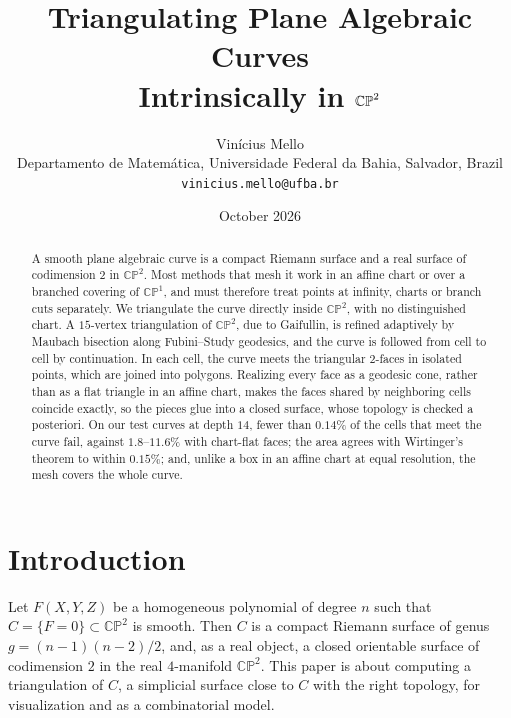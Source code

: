 \documentclass[11pt]{article}
\title{\bf Triangulating Plane Algebraic Curves\\ Intrinsically in $\CP^2$}
\author{Vin\'icius Mello\\[2pt]
{\small Departamento de Matem\'atica, Universidade Federal da Bahia, Salvador, Brazil}\\
{\small\texttt{vinicius.mello@ufba.br}}}
\date{October 2026}
\theoremstyle{plain}
\theoremstyle{definition}
\theoremstyle{remark}
\newcommand{\CP}{\mathbb{CP}}
\begin{document}
\maketitle

\begin{abstract}
A smooth plane algebraic curve is a compact Riemann surface and a real
surface of codimension $2$ in $\CP^2$. Most methods that mesh it work in
an affine chart or over a branched covering of $\CP^1$, and must
therefore treat points at infinity, charts or branch cuts separately. We
triangulate the curve directly inside $\CP^2$, with no distinguished
chart. A $15$-vertex triangulation of $\CP^2$, due to Gaifullin, is
refined adaptively by Maubach bisection along Fubini--Study geodesics,
and the curve is followed from cell to cell by continuation. In each
cell, the curve meets the triangular $2$-faces in isolated points, which
are joined into polygons. Realizing every face as a geodesic cone,
rather than as a flat triangle in an affine chart, makes the faces shared
by neighboring cells coincide exactly, so the pieces glue into a closed
surface, whose topology is checked a posteriori. On our test curves at
depth $14$, fewer than $0.14\%$ of the cells that meet the curve fail, against
$1.8$--$11.6\%$ with chart-flat faces; the area agrees with Wirtinger's
theorem to within $0.15\%$; and, unlike a box in an affine chart at equal
resolution, the mesh covers the whole curve.
\end{abstract}

\tableofcontents

\section{Introduction}
\label{sec:intro}

Let $F(X,Y,Z)$ be a homogeneous polynomial of degree $n$ such that
$C=\{F=0\}\subset\CP^2$ is smooth. Then $C$ is a compact Riemann surface of
genus $g=(n-1)(n-2)/2$, and, as a real object, a closed orientable surface
of codimension $2$ in the real $4$-manifold $\CP^2$. This paper is about
computing a triangulation of $C$, a simplicial surface close to $C$ with
the right topology, for visualization and as a combinatorial model.
\end{document}
